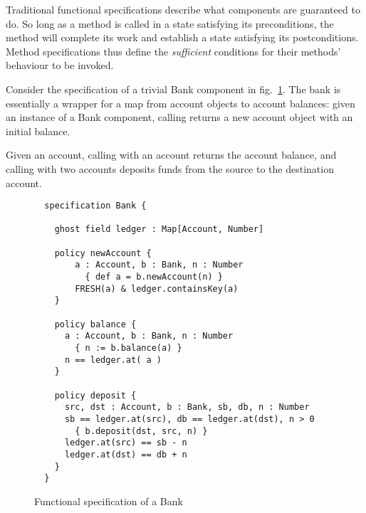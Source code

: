 \label{section:motivationBank}


Traditional functional specifications describe what components are
guaranteed to do. So long as a method is called in a state satisfying
its preconditions, the method will complete its work and establish a
state satisfying its postconditions.  Method specifications thus
define the \textit{sufficient} conditions for their methods' behaviour
to be invoked.


Consider the specification of a trivial Bank component in
fig.~\ref{fig:BankSpec}.  The bank is essentially a wrapper for a map
from account objects to account balances: given an instance of a Bank
component, calling  returns a new account object with
an initial balance.  

Given an account, calling  with an
account returns the account balance, and calling  with
two accounts deposits funds from the source to the destination account.

\begin{figure}[tbp]
\begin{lstlisting}
  specification Bank {

    ghost field ledger : Map[Account, Number]

    policy newAccount {
        a : Account, b : Bank, n : Number
          { def a = b.newAccount(n) }
        FRESH(a) & ledger.containsKey(a)
    }

    policy balance {
      a : Account, b : Bank, n : Number
        { n := b.balance(a) }
      n == ledger.at( a )
    }

    policy deposit {
      src, dst : Account, b : Bank, sb, db, n : Number
      sb == ledger.at(src), db == ledger.at(dst), n > 0
        { b.deposit(dst, src, n) }
      ledger.at(src) == sb - n
      ledger.at(dst) == db + n
    }
  }
\end{lstlisting}
\caption{Functional specification of a Bank}
\label{fig:BankSpec}
\end{figure}

